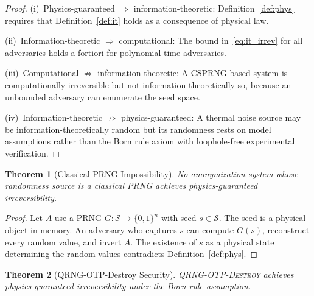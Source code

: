 \documentclass[acmsmall,screen,review,anonymous]{acmart}
\newtheorem{theorem}{Theorem}
\begin{document}
\begin{proof}
(i)~Physics-guaranteed $\Rightarrow$ information-theoretic: Definition~\ref{def:phys} requires that Definition~\ref{def:it} holds as a consequence of physical law.

(ii)~Information-theoretic $\Rightarrow$ computational: The bound in~\eqref{eq:it_irrev} for all adversaries holds a fortiori for polynomial-time adversaries.

(iii)~Computational $\not\Rightarrow$ information-theoretic: A CSPRNG-based system is computationally irreversible but not information-theoretically so, because an unbounded adversary can enumerate the seed space.

(iv)~Information-theoretic $\not\Rightarrow$ physics-guaranteed: A thermal noise source may be information-theoretically random but its randomness rests on model assumptions rather than the Born rule axiom with loophole-free experimental verification.
\end{proof}

\begin{theorem}[Classical PRNG Impossibility]
\label{thm:prng_impossible}
No anonymization system whose randomness source is a classical PRNG achieves physics-guaranteed irreversibility.
\end{theorem}

\begin{proof}
Let $A$ use a PRNG $G\colon \mathcal{S} \to \{0,1\}^n$ with seed $s \in \mathcal{S}$. The seed is a physical object in memory. An adversary who captures $s$ can compute $G(s)$, reconstruct every random value, and invert $A$. The existence of $s$ as a physical state determining the random values contradicts Definition~\ref{def:phys}.
\end{proof}

\begin{theorem}[QRNG-OTP-Destroy Security]
\label{thm:qrng_secure}
\textsc{QRNG-OTP-Destroy} achieves physics-guaranteed irreversibility under the Born rule assumption.
\end{theorem}
\end{document}
